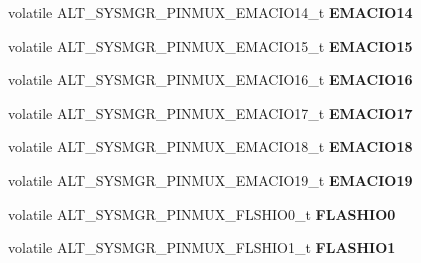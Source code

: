 \begin{DoxyCompactItemize}
\item 
\mbox{\label{structALT__SYSMGR__PINMUX__s_a09793f29fc1f3e2583a309ddebf22498}} 
volatile A\+L\+T\+\_\+\+S\+Y\+S\+M\+G\+R\+\_\+\+P\+I\+N\+M\+U\+X\+\_\+\+E\+M\+A\+C\+I\+O14\+\_\+t {\bfseries E\+M\+A\+C\+I\+O14}
\item 
\mbox{\label{structALT__SYSMGR__PINMUX__s_a9976db0a32f52789c0b4e54a175cf61d}} 
volatile A\+L\+T\+\_\+\+S\+Y\+S\+M\+G\+R\+\_\+\+P\+I\+N\+M\+U\+X\+\_\+\+E\+M\+A\+C\+I\+O15\+\_\+t {\bfseries E\+M\+A\+C\+I\+O15}
\item 
\mbox{\label{structALT__SYSMGR__PINMUX__s_a1e09d82ccd263edad77d983dc4ddc974}} 
volatile A\+L\+T\+\_\+\+S\+Y\+S\+M\+G\+R\+\_\+\+P\+I\+N\+M\+U\+X\+\_\+\+E\+M\+A\+C\+I\+O16\+\_\+t {\bfseries E\+M\+A\+C\+I\+O16}
\item 
\mbox{\label{structALT__SYSMGR__PINMUX__s_a2a125eedba7fecab5c06693bf94350aa}} 
volatile A\+L\+T\+\_\+\+S\+Y\+S\+M\+G\+R\+\_\+\+P\+I\+N\+M\+U\+X\+\_\+\+E\+M\+A\+C\+I\+O17\+\_\+t {\bfseries E\+M\+A\+C\+I\+O17}
\item 
\mbox{\label{structALT__SYSMGR__PINMUX__s_a69a820e192236d6ee5e6f1e3bf37449a}} 
volatile A\+L\+T\+\_\+\+S\+Y\+S\+M\+G\+R\+\_\+\+P\+I\+N\+M\+U\+X\+\_\+\+E\+M\+A\+C\+I\+O18\+\_\+t {\bfseries E\+M\+A\+C\+I\+O18}
\item 
\mbox{\label{structALT__SYSMGR__PINMUX__s_af2bd51a6f9aad411e5c55c45efde602e}} 
volatile A\+L\+T\+\_\+\+S\+Y\+S\+M\+G\+R\+\_\+\+P\+I\+N\+M\+U\+X\+\_\+\+E\+M\+A\+C\+I\+O19\+\_\+t {\bfseries E\+M\+A\+C\+I\+O19}
\item 
\mbox{\label{structALT__SYSMGR__PINMUX__s_ae145bdfbae3003de3feff13d29207ffc}} 
volatile A\+L\+T\+\_\+\+S\+Y\+S\+M\+G\+R\+\_\+\+P\+I\+N\+M\+U\+X\+\_\+\+F\+L\+S\+H\+I\+O0\+\_\+t {\bfseries F\+L\+A\+S\+H\+I\+O0}
\item 
\mbox{\label{structALT__SYSMGR__PINMUX__s_ad7cad5867b401681772f7865eeecc44e}} 
volatile A\+L\+T\+\_\+\+S\+Y\+S\+M\+G\+R\+\_\+\+P\+I\+N\+M\+U\+X\+\_\+\+F\+L\+S\+H\+I\+O1\+\_\+t {\bfseries F\+L\+A\+S\+H\+I\+O1}

\end{DoxyCompactItemize}
